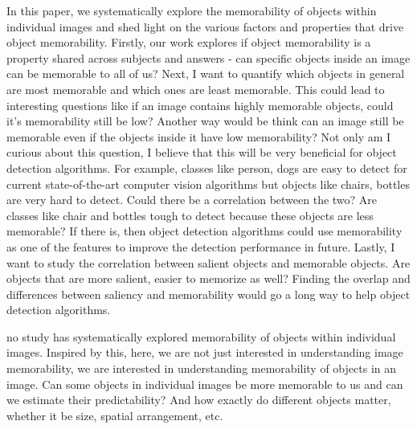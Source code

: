 
In this paper, we systematically explore the memorability of objects within individual images and shed light on the various factors and properties that drive object memorability. Firstly, our work explores if object memorability is a property shared across subjects and answers - can specific objects inside an image can be memorable to all of us? Next, I want to quantify which objects in general are most memorable and which ones are least memorable. This could lead to interesting questions like if an image contains highly memorable objects, could it's memorability still be low? Another way would be think can an image still be memorable even if the objects inside it have low memorability? Not only am I curious about this question, I believe that this will be very beneficial for object detection algorithms. For example, classes like person, dogs are easy to detect for current state-of-the-art computer vision algorithms but objects like chairs, bottles are very hard to detect. Could there be a correlation between the two? Are classes like chair and bottles tough to detect because these objects are less memorable? If there is, then object detection algorithms could use memorability as one of the features to improve the detection performance in future. Lastly, I want to study the correlation between salient objects and memorable objects. Are objects that are more salient, easier to memorize as well? Finding the overlap and differences between saliency and memorability would go a long way to help object detection algorithms.

no study has systematically explored memorability of objects within individual images. Inspired by this, here, we are not just interested in understanding image memorability, we are interested in understanding memorability of objects in an image. Can some objects in individual images be more memorable to us and can we estimate their predictability?  And how exactly do different objects matter, whether it be size, spatial arrangement, etc.

